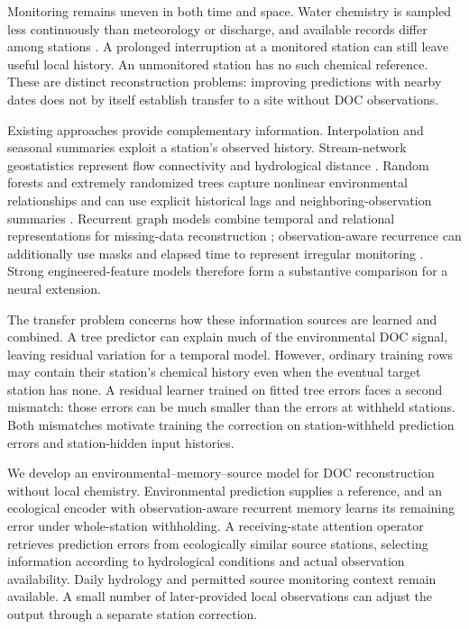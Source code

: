 \documentclass[11pt]{article}
\begin{document}
Monitoring remains uneven in both time and space. Water chemistry is sampled less continuously than meteorology or discharge, and available records differ among stations \citep{sterle2024}. A prolonged interruption at a monitored station can still leave useful local history. An unmonitored station has no such chemical reference. These are distinct reconstruction problems: improving predictions with nearby dates does not by itself establish transfer to a site without DOC observations.

Existing approaches provide complementary information. Interpolation and seasonal summaries exploit a station's observed history. Stream-network geostatistics represent flow connectivity and hydrological distance \citep{verhoef2006}. Random forests and extremely randomized trees capture nonlinear environmental relationships and can use explicit historical lags and neighboring-observation summaries \citep{breiman2001,geurts2006}. Recurrent graph models combine temporal and relational representations for missing-data reconstruction \citep{cini2022}; observation-aware recurrence can additionally use masks and elapsed time to represent irregular monitoring \citep{che2018}. Strong engineered-feature models therefore form a substantive comparison for a neural extension.

The transfer problem concerns how these information sources are learned and combined. A tree predictor can explain much of the environmental DOC signal, leaving residual variation for a temporal model. However, ordinary training rows may contain their station's chemical history even when the eventual target station has none. A residual learner trained on fitted tree errors faces a second mismatch: those errors can be much smaller than the errors at withheld stations. Both mismatches motivate training the correction on station-withheld prediction errors and station-hidden input histories.

We develop an environmental--memory--source model for DOC reconstruction without local chemistry. Environmental prediction supplies a reference, and an ecological encoder with observation-aware recurrent memory learns its remaining error under whole-station withholding. A receiving-state attention operator retrieves prediction errors from ecologically similar source stations, selecting information according to hydrological conditions and actual observation availability. Daily hydrology and permitted source monitoring context remain available. A small number of later-provided local observations can adjust the output through a separate station correction.
\end{document}
